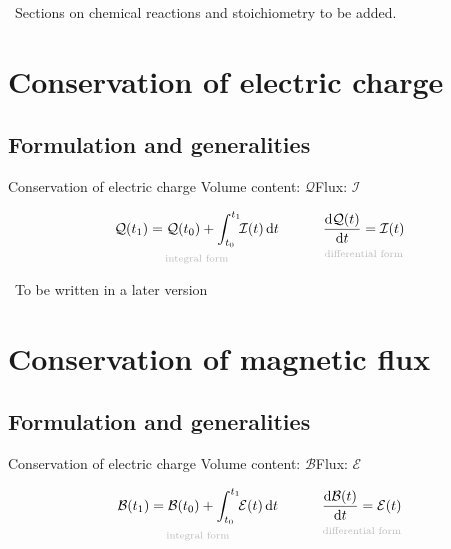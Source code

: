 \documentclass[a4paper,12pt,%
onecolumn,oneside,%
british%
]{memoir}
\newcommand{\mynotew}[1]{{\footnotesize\color{midgrey}\faIcon{tools}\ #1}}
\newcommand*{\di}{\mathrm{d}}%
\renewcommand*{\|}[1][]{\nonscript\:#1\vert\nonscript\:\mathopen{}}
\newcommand*{\yti}{t_{0}}
\newcommand*{\ytf}{t_{1}}
\newcommand*{\yC}{\mathcal{Q}}
\newcommand*{\yI}{\mathcal{I}}
\newcommand*{\yBf}{\mathcal{B}}
\newcommand*{\yEv}{\mathcal{E}}
\begin{document}
\mynotew{Sections on chemical reactions and stoichiometry to be added.}

\printpagenotes*
\clearpage
\chapter{Conservation of electric charge}
\label{cha:cons_charge}

\section{Formulation and generalities}
\label{sec:cons_charge_formulation}

\begin{definition}{Conservation of electric charge}
  Volume content: $\yC$\qquad Flux: $\yI$

  \begin{equation}
    \label{eq:cons_charge}
    \underbracket[0pt]{\yC(\ytf) =
      \yC(\yti) +
      \int_{\yti}^{\ytf}\!\!\yI(t)\,\di t}_{\mathclap{\text{\color{grey}integral form}}}
      \qquad\quad
      \underbracket[0pt]{\frac{\di\yC(t)}{\di t} =
        \yI(t)}_{\mathclap{\text{\color{grey}differential form}}}
  \end{equation}
\end{definition}


\mynotew{To be written in a later version}


\printpagenotes*
\clearpage
\chapter{Conservation of magnetic flux}
\label{cha:cons_magneticflux}

\section{Formulation and generalities}
\label{sec:cons_magneticflux_formulation}

\begin{definition}{Conservation of electric charge}
  Volume content: $\yBf$\qquad Flux: $\yEv$

  \begin{equation}
    \label{eq:cons_magneticflux}
    \underbracket[0pt]{\yBf(\ytf) =
      \yBf(\yti) +
      \int_{\yti}^{\ytf}\!\!\yEv(t)\,\di t}_{\mathclap{\text{\color{grey}integral form}}}
      \qquad\quad
      \underbracket[0pt]{\frac{\di\yBf(t)}{\di t} =
        \yEv(t)}_{\mathclap{\text{\color{grey}differential form}}}
  \end{equation}
\end{definition}
\end{document}
